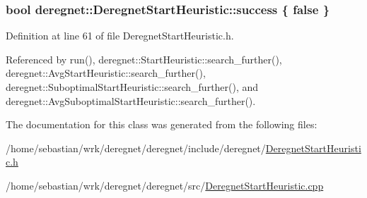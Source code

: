 \subsubsection[{\texorpdfstring{success}{success}}]{\setlength{\rightskip}{0pt plus 5cm}bool deregnet\+::\+Deregnet\+Start\+Heuristic\+::success \{ false \}\hspace{0.3cm}{\ttfamily [protected]}}\hypertarget{classderegnet_1_1DeregnetStartHeuristic_a72fd16ee027f6aa973f1ff29746addba}{}\label{classderegnet_1_1DeregnetStartHeuristic_a72fd16ee027f6aa973f1ff29746addba}


Definition at line 61 of file Deregnet\+Start\+Heuristic.\+h.



Referenced by run(), deregnet\+::\+Start\+Heuristic\+::search\+\_\+further(), deregnet\+::\+Avg\+Start\+Heuristic\+::search\+\_\+further(), deregnet\+::\+Suboptimal\+Start\+Heuristic\+::search\+\_\+further(), and deregnet\+::\+Avg\+Suboptimal\+Start\+Heuristic\+::search\+\_\+further().



The documentation for this class was generated from the following files\+:\begin{DoxyCompactItemize}
\item 
/home/sebastian/wrk/deregnet/deregnet/include/deregnet/\hyperlink{DeregnetStartHeuristic_8h}{Deregnet\+Start\+Heuristic.\+h}\item 
/home/sebastian/wrk/deregnet/deregnet/src/\hyperlink{DeregnetStartHeuristic_8cpp}{Deregnet\+Start\+Heuristic.\+cpp}\end{DoxyCompactItemize}
